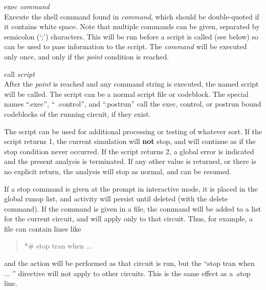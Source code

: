 \begin{description}
\item{\vt exec} {\it command}\\
Execute the {\WRspice} shell command found in {\it command\/}, which
should be double-quoted if it contains white space.  Note that
multiple commands can be given, separated by semicolon ({\vt `;'})
characters.  This will be run before a script is called (see below) so
can be used to pass information to the script.  The {\it command} will
be executed only once, and only if the {\it point} condition is
reached.

\item{\vt call} {\it script}\\
After the {\it point} is reached and any command string is executed,
the named script will be called.  The script can be a normal script
file or codeblock.  The special names ``{\vt .exec}'', ``{\vt
.control}'', and ``{\vt .postrun}'' call the exec, control, or postrun
bound codeblocks of the running circuit, if they exist.

The script can be used for additional processing or testing of
whatever sort.  If the script returns 1, the current simulation will
{\bf not} stop, and will continue as if the stop condition never
occurred.  If the script returns 2, a global error is indicated and
the present analysis is terminated.  If any other value is returned,
or there is no explicit return, the analysis will stop as normal, and
can be resumed.
\end{description}

If a {\cb stop} command is given at the prompt in interactive mode, it
is placed in the global runop list, and activity will persist until
deleted (with the {\cb delete} command).  If the command is given in a
file, the command will be added to a list for the current circuit, and
will apply only to that circuit.  Thus, for example, a {\WRspice} file
can contain lines like
\begin{quote}\vt
*\# stop tran when ...
\end{quote}
and the action will be performed as that circuit is run, but the
``{\vt stop tran when ...  }'' directive will not apply to other
circuits.  This is the same effect as a {\vt .stop} line.


\subsection{}

